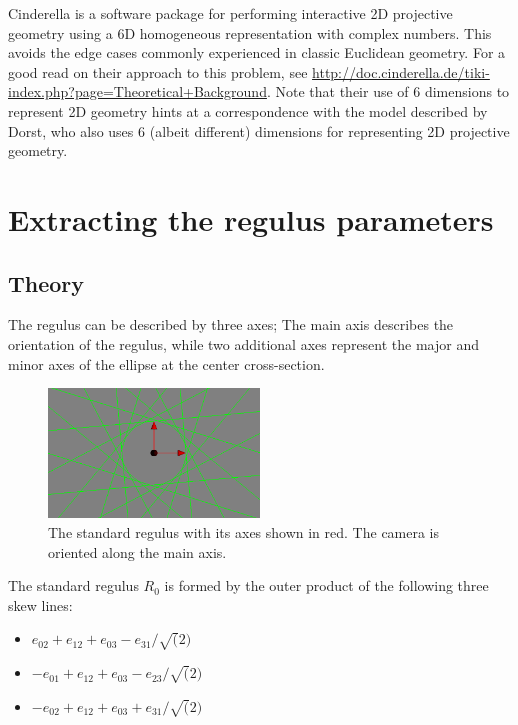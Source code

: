 \documentclass[a4paper, 10pt]{article}
\begin{document}
Cinderella\cite{richter1999interactive} is a software package for performing
interactive 2D projective geometry using a 6D homogeneous representation with
complex numbers. This avoids the edge cases commonly experienced in classic
Euclidean geometry. For a good read on their approach to this problem, see
\url{http://doc.cinderella.de/tiki-index.php?page=Theoretical+Background}.
Note that their use of 6 dimensions to represent 2D geometry hints at a
correspondence with the model described by Dorst, who also uses 6 (albeit
different) dimensions for representing 2D projective geometry.

\section{Extracting the regulus parameters}
\subsection{Theory}
The regulus can be described by three axes; The main axis describes the
orientation of the regulus, while two additional axes represent the major and
minor axes of the ellipse at the center cross-section.

\begin{figure}[htbp]
  \centering
  \includegraphics[width=0.5\textwidth]{axes.png}
  \caption{The standard regulus with its axes shown in red. The camera is
    oriented along the main axis.}
  \label{fig:axes}
\end{figure}

The standard regulus $R_0$ is formed by the outer product of the following three
skew lines:
\begin{itemize}
  \item $e_{02} + e_{12} + e_{03} - e_{31} / \sqrt(2)$
  \item $-e_{01} + e_{12} + e_{03} - e_{23} / \sqrt(2)$
  \item $-e_{02} + e_{12} + e_{03} + e_{31} / \sqrt(2)$
\end{itemize}
\end{document}
